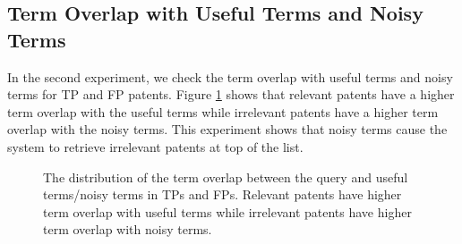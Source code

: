 \subsection{Term Overlap with Useful Terms and Noisy Terms}
In the second experiment, we check the term overlap with useful terms and noisy terms for TP and FP patents. Figure \ref{fig:usefulnoisy} shows that relevant patents have a higher term overlap with the useful terms while irrelevant patents have a higher term overlap with the noisy terms. This experiment shows that noisy terms cause the system to retrieve irrelevant patents at top of the list. 
\begin{figure}[t!]
\begin{centering}
 \hspace*{1.5cm}  
\par\end{centering} 

\protect\caption{The distribution of the term overlap between the query and useful terms/noisy terms in TPs and FPs. Relevant patents have higher term overlap with useful terms while irrelevant patents have higher term overlap with noisy terms.}
\label{fig:usefulnoisy}
\end{figure}
